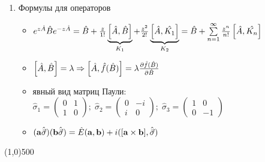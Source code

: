 \begin{enumerate}[label=\textbf{\underline{\arabic*.}}]
\begin{itemize}
        \end{itemize}
\item Формулы для операторов  \begin{itemize}
            \item
            $ e^{z\hat{A}}\hat{B}e^{-z\hat{A}} = \hat{B} + \frac{z}{1!}\underbrace{\left[ \hat{A}, \hat{B} \right]}_{K_1} + \frac{z^2}{2!}\underbrace{\left[ \hat{A}, \hat{K_1} \right]}_{K_2} = \hat{B}+\sum\limits_{n=1}^{\infty}\frac{z^n}{n!}\left[ \hat{A}, \hat{K_n} \right] $
            \item
            $ \left[ \hat{A}, \hat{B} \right]=\lambda \Rightarrow \left[ \hat{A}, \hat{f}(\hat{B}) \right]=\lambda \frac{\partial \hat{f}(\hat{B})}{\partial \hat{B}} $
            \item явный вид матриц Паули:
            $ \hat{\sigma}_1=\begin{pmatrix} 0&1\\1&0 \end{pmatrix};\; \hat{\sigma}_2=\begin{pmatrix} 0&-i\\i&0 \end{pmatrix};\; \hat{\sigma}_3=\begin{pmatrix} 1&0\\0&-1 \end{pmatrix} $
            \item
            $ (\mathbf{a}\hat{\vec{\sigma}})(\mathbf{b}\hat{\vec{\sigma}}) = \hat{E}(\mathbf{a},\mathbf{b}) + i([\mathbf{a}\times\mathbf{b}],\hat{\vec{\sigma}}) $
        \end{itemize}
\end{enumerate}
\vfill\line(1,0){500}

